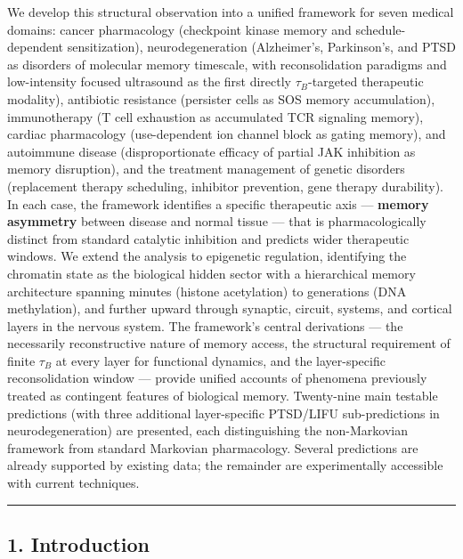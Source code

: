\documentclass[
]{article}
\begin{document}
We develop this structural observation into a unified framework for
seven medical domains: cancer pharmacology (checkpoint kinase memory and
schedule-dependent sensitization), neurodegeneration (Alzheimer's,
Parkinson's, and PTSD as disorders of molecular memory timescale, with
reconsolidation paradigms and low-intensity focused ultrasound as the
first directly \(\tau_B\)-targeted therapeutic modality), antibiotic
resistance (persister cells as SOS memory accumulation), immunotherapy
(T cell exhaustion as accumulated TCR signaling memory), cardiac
pharmacology (use-dependent ion channel block as gating memory), and
autoimmune disease (disproportionate efficacy of partial JAK inhibition
as memory disruption), and the treatment management of genetic disorders
(replacement therapy scheduling, inhibitor prevention, gene therapy
durability). In each case, the framework identifies a specific
therapeutic axis --- \textbf{memory asymmetry} between disease and
normal tissue --- that is pharmacologically distinct from standard
catalytic inhibition and predicts wider therapeutic windows. We extend
the analysis to epigenetic regulation, identifying the chromatin state
as the biological hidden sector with a hierarchical memory architecture
spanning minutes (histone acetylation) to generations (DNA methylation),
and further upward through synaptic, circuit, systems, and cortical
layers in the nervous system. The framework's central derivations ---
the necessarily reconstructive nature of memory access, the structural
requirement of finite \(\tau_B\) at every layer for functional dynamics,
and the layer-specific reconsolidation window --- provide unified
accounts of phenomena previously treated as contingent features of
biological memory. Twenty-nine main testable predictions (with three
additional layer-specific PTSD/LIFU sub-predictions in
neurodegeneration) are presented, each distinguishing the non-Markovian
framework from standard Markovian pharmacology. Several predictions are
already supported by existing data; the remainder are experimentally
accessible with current techniques.

\begin{center}\rule{0.5\linewidth}{0.5pt}\end{center}

\hypertarget{introduction}{%
\subsection{1. Introduction}\label{introduction}}
\end{document}
